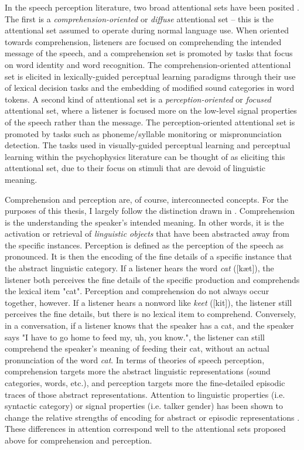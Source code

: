 In the speech perception literature, two broad attentional sets have been posited \citep{Cutler1987, Pitt2012}.  
The first is a \emph{comprehension-oriented} or \emph{diffuse} attentional set -- this is the attentional set assumed to operate during normal language use.  
When oriented towards comprehension, listeners are focused on comprehending the intended message of the speech, and a comprehension set is promoted by tasks that focus on word identity and word recognition.
The comprehension-oriented attentional set is elicited in lexically-guided perceptual learning paradigms through their use of lexical decision tasks and the embedding of modified sound categories in word tokens. 
A second kind of attentional set is a \emph{perception-oriented} or \emph{focused} attentional set, where a listener is focused more on the low-level signal properties of the speech rather than the message.
The perception-oriented attentional set is promoted by tasks such as phoneme/syllable monitoring or mispronunciation detection.
The tasks used in visually-guided perceptual learning and perceptual learning within the psychophysics literature can be thought of as eliciting this attentional set, due to their focus on stimuli that are devoid of linguistic meaning.

Comprehension and perception are, of course, interconnected concepts. 
For the purposes of this thesis, I largely follow the distinction drawn in \citet{Pitt2012}.
Comprehension is the understanding the speaker's intended meaning.
In other words, it is the activation or retrieval of \emph{linguistic objects} that have been abstracted away from the specific instances.
Perception is defined as the perception of the speech as pronounced.
It is then the encoding  of the fine details of a specific instance that the abstract linguistic category. 
If a listener hears the word \emph{cat} ([k\ae t]), the listener both perceives the fine details of the specific production and comprehends the lexical item "cat".
Perception and comprehension do not always occur together, however.
If a listener hears a nonword like \emph{keet} ([kit]), the listener still perceives the fine details, but there is no lexical item to comprehend.
Conversely, in a conversation, if a listener knows that the speaker has a cat, and the speaker says "I have to go home to feed my, uh, you know.", the listener can still comprehend the speaker's meaning of feeding their cat, without an actual pronunciation of the word \emph{cat}.
In terms of theories of speech perception, comprehension targets more the abstract linguistic representations (sound categories, words, etc.), and perception targets more the fine-detailed episodic traces of those abstract representations.
Attention to linguistic properties (i.e. syntactic category) or signal properties (i.e. talker gender) has been shown to change the relative strengths of encoding for abstract or episodic representations \citep{Goldinger1996,Theodore2015}.
These differences in attention correspond well to the attentional sets proposed above for comprehension and perception.

